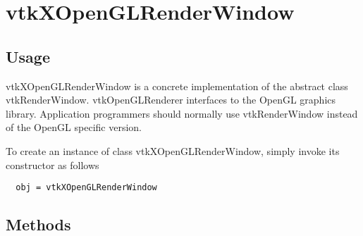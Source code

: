 \section{vtkXOpenGLRenderWindow}

\subsection{Usage}

 vtkXOpenGLRenderWindow is a concrete implementation of the abstract class
 vtkRenderWindow. vtkOpenGLRenderer interfaces to the OpenGL graphics
 library. Application programmers should normally use vtkRenderWindow
 instead of the OpenGL specific version.

To create an instance of class vtkXOpenGLRenderWindow, simply
invoke its constructor as follows
\begin{verbatim}
  obj = vtkXOpenGLRenderWindow
\end{verbatim}
\subsection{Methods}

